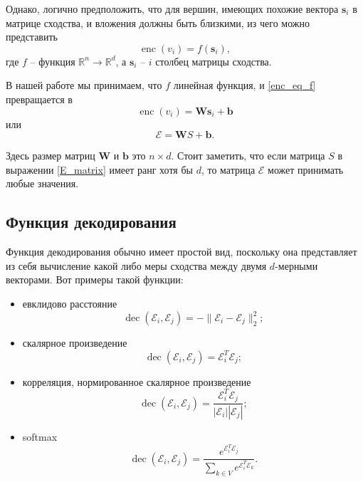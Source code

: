 \documentclass[12pt,a4paper]{extarticle}
\newcommand{\R}{\mathbb{R}}
\newcommand{\E}{\mathcal{E}}
\newcommand{\W}{\textbf{W}}
\newcommand{\s}{\textbf{s}}
\newcommand{\encoder}{\operatorname{enc}}
\newcommand{\decoder}{\operatorname{dec}}
\begin{document}
    Однако, логично предположить, что для вершин, имеющих похожие вектора $\s_i$ в матрице сходства, и вложения должны быть близкими, из чего можно представить
    \begin{equation} \label{enc_eq_f}
        \encoder(v_i) = f(\s_i),
    \end{equation}
    где $f$ -- функция $\R^n \to \R^d$, а $\s_i$ -- $i$ столбец матрицы сходства.
    
    В нашей работе мы принимаем, что $f$ линейная функция, и \eqref{enc_eq_f} превращается в
    \begin{equation}
        \encoder(v_i) = \W\s_i + \textbf{b}
    \end{equation}
    или
    \begin{equation} \label{E_matrix}
        \E = \W S + \textbf{b}.
    \end{equation}
    
    Здесь размер матриц $\W$ и $\textbf{b}$ это $n \times d$.
    Стоит заметить, что если матрица $S$ в выражении \eqref{E_matrix} имеет ранг хотя бы $d$, то матрица $\E$ может принимать любые значения.

    \subsection{Функция декодирования}
    Функция декодирования обычно имеет простой вид, поскольку она представляет из себя вычисление какой либо меры сходства между двумя $d$-мерными векторами. Вот примеры такой функции:
    \begin{itemize}
        \item евклидово расстояние
            \begin{equation} \label{dec_dist}
            \decoder(\E_i, \E_j) = - \lVert \E_i - \E_j \rVert_2 ^ 2;
            \end{equation}
        \item скалярное произведение
            \begin{equation} \label{dec_scal}
            \decoder(\E_i, \E_j) = \E_i^T\E_j;
            \end{equation}
        \item корреляция, нормированное скалярное произведение
            \begin{equation} \label{corr}
            \decoder(\E_i, \E_j) =  \frac{\E_i^T\E_j}{|\E_i||\E_j|};
            \end{equation}
        \item softmax
            \[\decoder(\E_i, \E_j) = \frac{e^{\E_i^T\E_j}}{\sum_{k \in V} e^{\E_i^T\E_k}}.\]
    \end{itemize}
    
\end{document}
